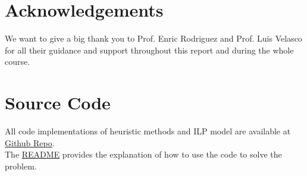 \documentclass{article}
\begin{document}
\section{Acknowledgements}

We want to give a big thank you to Prof. Enric Rodriguez and Prof. Luis Velasco for all their guidance and support throughout this report and during the whole course.


\section{Source Code}

All code implementations of heuristic methods and ILP model are available at \href{https://github.com/tmactong/AMMM-project}{Github Repo}.\\
The \href{https://github.com/tmactong/AMMM-project/blob/main/README.md}{README} provides the explanation of how to use the code to solve the problem.
\end{document}
